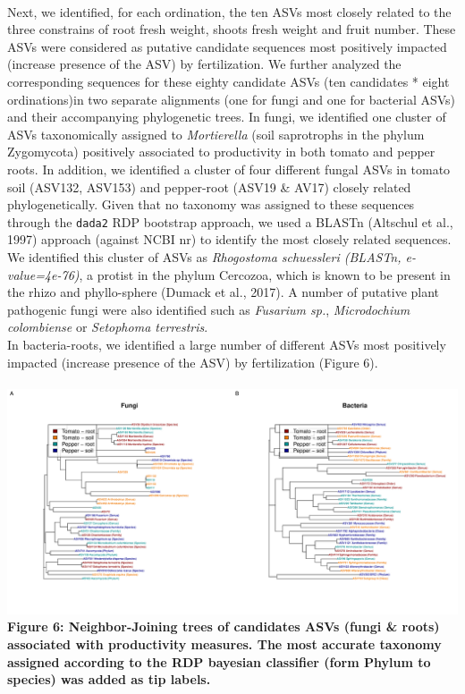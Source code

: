 \documentclass[11pt,]{article}
\begin{document}
\hspace*{0.333em}\\
Next, we identified, for each ordination, the ten ASVs most closely
related to the three constrains of root fresh weight, shoots fresh
weight and fruit number. These ASVs were considered as putative
candidate sequences most positively impacted (increase presence of the
ASV) by fertilization. We further analyzed the corresponding sequences
for these eighty candidate ASVs (ten candidates * eight ordinations)in
two separate alignments (one for fungi and one for bacterial ASVs) and
their accompanying phylogenetic trees. In fungi, we identified one
cluster of ASVs taxonomically assigned to \emph{Mortierella} (soil
saprotrophs in the phylum Zygomycota) positively associated to
productivity in both tomato and pepper roots. In addition, we identified
a cluster of four different fungal ASVs in tomato soil (ASV132, ASV153)
and pepper-root (ASV19 \& AV17) closely related phylogenetically. Given
that no taxonomy was assigned to these sequences through the
\texttt{dada2} RDP bootstrap approach, we used a BLASTn (Altschul et
al., 1997) approach (against NCBI nr) to identify the most closely
related sequences. We identified this cluster of ASVs as
\emph{Rhogostoma schuessleri (BLASTn, e-value=4e-76)}, a protist in the
phylum Cercozoa, which is known to be present in the rhizo and
phyllo-sphere (Dumack et al., 2017). A number of putative plant
pathogenic fungi were also identified such as \emph{Fusarium sp.},
\emph{Microdochium colombiense} or \emph{Setophoma terrestris}. ~\\
In bacteria-roots, we identified a large number of different ASVs most
positively impacted (increase presence of the ASV) by fertilization
(Figure 6). ~\\
\hspace*{0.333em}\\
\includegraphics{../figures/Figure7_candidateASVs.pdf}\\
\textbf{Figure 6: Neighbor-Joining trees of candidates ASVs (fungi \&
roots) associated with productivity measures. The most accurate taxonomy
assigned according to the RDP bayesian classifier (form Phylum to
species) was added as tip labels.} ~\\
\hspace*{0.333em}
\end{document}
